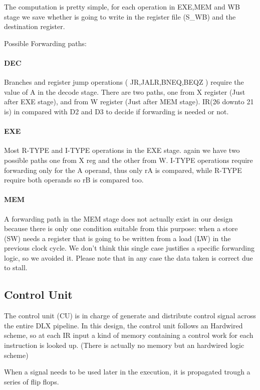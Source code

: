 \documentclass[12pt]{article}
\begin{document}
The computation is pretty simple, for each operation in EXE,MEM and WB stage we save whether is going to write in the register file (S\_WB) and the destination register.

Possible Forwarding paths:
\paragraph{DEC} Branches and register jump operations ( JR,JALR,BNEQ,BEQZ ) require the value of A in the decode stage. There are two paths, one from X register (Just after EXE stage), and from W register (Just after MEM stage). IR(26 downto 21 is) in compared with D2 and D3 to decide if forwarding is needed or not.
\paragraph{EXE} Most R-TYPE and I-TYPE operations in the EXE stage. again we have two possible paths one from X reg and the other from W. I-TYPE operations require forwarding only for the A operand, thus only rA is compared, while R-TYPE require both operands so rB is compared too.
\paragraph{MEM} A forwarding path in the MEM stage does not actually exist in our design because there is only one condition suitable from this purpose: when a store (SW) needs a register that is going to be written from a load (LW) in the previous clock cycle.
We don't think this single case justifies a specific forwarding logic, so we avoided it. Please note that in any case the data taken is correct due to stall.

\subsection{Control Unit}
The control unit (CU) is in charge of generate and distribute control signal across the entire DLX pipeline.
In this design, the control unit follows an Hardwired scheme, so at each IR input a kind of memory containing a control work for each instruction is looked up. (There is actually no memory but an hardwired logic scheme)

When a signal needs to be used later in the execution, it is propagated trough a series of flip flops.
\end{document}
